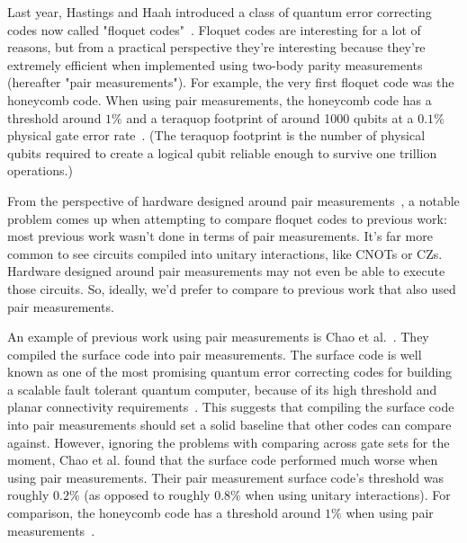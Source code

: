 \documentclass[onecolumn,unpublished,a4paper]{quantumarticle}
\theoremstyle{definition}
\theoremstyle{definition}
\theoremstyle{definition}
\begin{document}
Last year, Hastings and Haah introduced a class of quantum error correcting codes now called "floquet codes"~\cite{hastings2021dynamically}.
Floquet codes are interesting for a lot of reasons, but from a practical perspective they're interesting because they're extremely efficient when implemented using two-body parity measurements (hereafter "pair measurements").
For example, the very first floquet code was the honeycomb code.
When using pair measurements, the honeycomb code has a threshold around $1\%$ and a teraquop footprint of around 1000 qubits at a $0.1\%$ physical gate error rate~\cite{gidney2022planarhoneycomb,paetznick2022floquetmajoranaperformance,chao2020optimization}.
(The teraquop footprint is the number of physical qubits required to create a logical qubit reliable enough to survive one trillion operations.)

From the perspective of hardware designed around pair measurements~\cite{paetznick2022floquetmajoranaperformance}, a notable problem comes up when attempting to compare floquet codes to previous work: most previous work wasn't done in terms of pair measurements.
It's far more common to see circuits compiled into unitary interactions, like CNOTs or CZs.
Hardware designed around pair measurements may not even be able to execute those circuits.
So, ideally, we'd prefer to compare to previous work that also used pair measurements.

An example of previous work using pair measurements is Chao et al.~\cite{chao2020optimization}.
They compiled the surface code into pair measurements.
The surface code is well known as one of the most promising quantum error correcting codes for building a scalable fault tolerant quantum computer, because of its high threshold and planar connectivity requirements~\cite{fowler2012surfacecodereview}.
This suggests that compiling the surface code into pair measurements should set a solid baseline that other codes can compare against.
However, ignoring the problems with comparing across gate sets for the moment, Chao et al. found that the surface code performed much worse when using pair measurements.
Their pair measurement surface code's threshold was roughly $0.2\%$ (as opposed to roughly $0.8\%$ when using unitary interactions).
For comparison, the honeycomb code has a threshold around $1\%$ when using pair measurements~\cite{gidney2022planarhoneycomb,paetznick2022floquetmajoranaperformance}.
\end{document}
